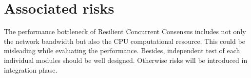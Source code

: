 \section{Associated risks}
The performance bottleneck of Resilient Concurrent Consensus includes not only the 
network bandwidth but also the CPU computational resource. 
This could be misleading while evaluating the performance.
Besides, independent test of each individual modules should be 
well designed. Otherwise risks will be introduced in integration phase.